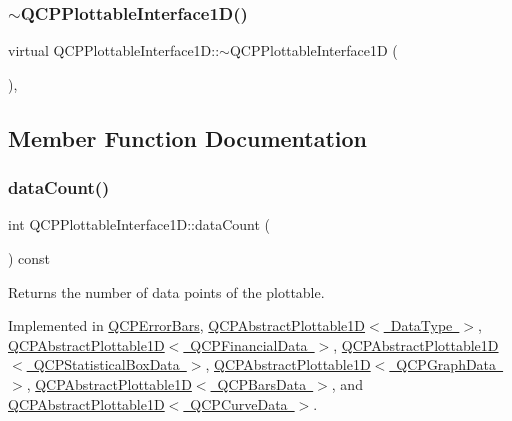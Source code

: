 \subsubsection{\texorpdfstring{$\sim$QCPPlottableInterface1D()}{~QCPPlottableInterface1D()}}
{\footnotesize\ttfamily virtual Q\+C\+P\+Plottable\+Interface1\+D\+::$\sim$\+Q\+C\+P\+Plottable\+Interface1D (\begin{DoxyParamCaption}{ }\end{DoxyParamCaption})\hspace{0.3cm}{\ttfamily [inline]}, {\ttfamily [virtual]}}



\subsection{Member Function Documentation}
\mbox{\label{class_q_c_p_plottable_interface1_d_a058a22c770ef4d5a0e878a7f02183da9}} 
\subsubsection{\texorpdfstring{dataCount()}{dataCount()}}
{\footnotesize\ttfamily int Q\+C\+P\+Plottable\+Interface1\+D\+::data\+Count (\begin{DoxyParamCaption}{ }\end{DoxyParamCaption}) const\hspace{0.3cm}{\ttfamily [pure virtual]}}

Returns the number of data points of the plottable. 

Implemented in \mbox{\hyperlink{class_q_c_p_error_bars_a18b797c62f2af000b926e52eb46d97c7}{Q\+C\+P\+Error\+Bars}}, \mbox{\hyperlink{class_q_c_p_abstract_plottable1_d_ab5dd99e4f1621e7dbd63438e0b02984e}{Q\+C\+P\+Abstract\+Plottable1\+D$<$ Data\+Type $>$}}, \mbox{\hyperlink{class_q_c_p_abstract_plottable1_d_ab5dd99e4f1621e7dbd63438e0b02984e}{Q\+C\+P\+Abstract\+Plottable1\+D$<$ Q\+C\+P\+Financial\+Data $>$}}, \mbox{\hyperlink{class_q_c_p_abstract_plottable1_d_ab5dd99e4f1621e7dbd63438e0b02984e}{Q\+C\+P\+Abstract\+Plottable1\+D$<$ Q\+C\+P\+Statistical\+Box\+Data $>$}}, \mbox{\hyperlink{class_q_c_p_abstract_plottable1_d_ab5dd99e4f1621e7dbd63438e0b02984e}{Q\+C\+P\+Abstract\+Plottable1\+D$<$ Q\+C\+P\+Graph\+Data $>$}}, \mbox{\hyperlink{class_q_c_p_abstract_plottable1_d_ab5dd99e4f1621e7dbd63438e0b02984e}{Q\+C\+P\+Abstract\+Plottable1\+D$<$ Q\+C\+P\+Bars\+Data $>$}}, and \mbox{\hyperlink{class_q_c_p_abstract_plottable1_d_ab5dd99e4f1621e7dbd63438e0b02984e}{Q\+C\+P\+Abstract\+Plottable1\+D$<$ Q\+C\+P\+Curve\+Data $>$}}.

